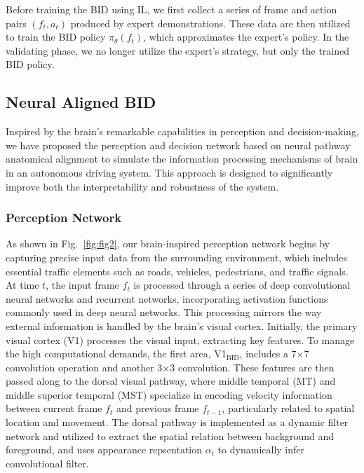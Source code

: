 Before training the BID using IL, we first collect a series of frame and action pairs $(f_{t}, a_{t})$ produced by expert demonstrations.
These data are then utilized to train the BID policy $\pi_{\theta}(f_{t})$, which approximates the expert's policy.
%
In the validating phase, we no longer utilize the expert's strategy, but only the trained BID policy.




\subsection{Neural Aligned BID}
\hspace{1pc}Inspired by the brain's remarkable capabilities in perception and decision-making, we have proposed the perception and decision network based on neural pathway anatomical alignment to simulate the information processing mechanisms of brain in an autonomous driving system. 
This approach is designed to significantly improve both the interpretability and robustness of the system.

\subsubsection{Perception Network}
\hspace{1pc}As shown in Fig.~\ref{fig:fig2}, our brain-inspired perception network begins by capturing precise input data from the surrounding environment, which includes essential traffic elements such as roads, vehicles, pedestrians, and traffic signals. 
At time $t$, the input frame $f_t$ is processed through a series of deep convolutional neural networks and recurrent networks, incorporating activation functions commonly used in deep neural networks. 
This processing mirrors the way external information is handled by the brain's visual cortex\cite{kubilius2019brain}. 
Initially, the primary visual cortex (V1) processes the visual input, extracting key features. 
To manage the high computational demands, the first area, V1$_\text{BID}$, includes a 7$\times$7 convolution operation and another 3$\times$3 convolution. 
These features are then passed along to the dorsal visual pathway, where middle temporal (MT) and middle superior temporal (MST) specialize in encoding velocity information between current frame $ f_t $ and previous frame $ f_{t-1} $, particularly related to spatial location and movement\cite{wang2022btn}. 
The dorsal pathway is implemented as a dynamic filter network\cite{jia2016dynamic} and utilized to extract the spatial relation between background and foreground, 
and uses appearance repsentation $ \alpha_t $ to dynamically infer convolutional filter.


